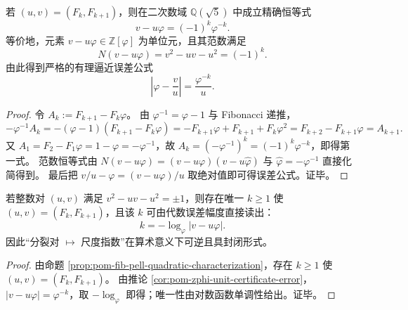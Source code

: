 \begin{corollary}\label{cor:pom-zphi-unit-certificate-error}
若 \((u,v)=(F_k,F_{k+1})\)，则在二次数域 \(\mathbb{Q}(\sqrt5)\) 中成立精确恒等式
\[
\boxed{\;v-u\varphi=(-1)^k\varphi^{-k}.\;}
\]
等价地，元素 \(v-u\varphi\in\mathbb{Z}[\varphi]\) 为单位元，且其范数满足
\[
\boxed{\;N(v-u\varphi)=v^2-uv-u^2=(-1)^k.\;}
\]
由此得到严格的有理逼近误差公式
\[
\boxed{\;\left|\varphi-\frac{v}{u}\right|=\frac{\varphi^{-k}}{u}.\;}
\]
\end{corollary}
\begin{proof}
令 \(A_k:=F_{k+1}-F_k\varphi\)。
由 \(\varphi^{-1}=\varphi-1\) 与 Fibonacci 递推，
\[
-\varphi^{-1}A_k=-(\varphi-1)(F_{k+1}-F_k\varphi)
=-F_{k+1}\varphi+F_{k+1}+F_k\varphi^2
=F_{k+2}-F_{k+1}\varphi
=A_{k+1}.
\]
又 \(A_1=F_2-F_1\varphi=1-\varphi=-\varphi^{-1}\)，故
\(
A_k=(-\varphi^{-1})^{k}=(-1)^k\varphi^{-k}
\)，即得第一式。
范数恒等式由 \(N(v-u\varphi)=(v-u\varphi)(v-u\widehat\varphi)\) 与 \(\widehat\varphi=-\varphi^{-1}\) 直接化简得到。
最后把 \(v/u-\varphi=(v-u\varphi)/u\) 取绝对值即可得误差公式。证毕。
\end{proof}

\begin{corollary}[由单个分裂对恢复尺度指数的可逆读出]\label{cor:pom-recover-k-from-unit-error}
若整数对 \((u,v)\) 满足 \(v^2-uv-u^2=\pm 1\)，则存在唯一 \(k\ge 1\) 使 \((u,v)=(F_k,F_{k+1})\)，且该 \(k\) 可由代数误差幅度直接读出：
\[
\boxed{\;k=-\log_\varphi|v-u\varphi|.\;}
\]
因此“分裂对 \(\mapsto\) 尺度指数”在算术意义下可逆且具封闭形式。
\end{corollary}
\begin{proof}
由命题 \ref{prop:pom-fib-pell-quadratic-characterization}，存在 \(k\ge 1\) 使 \((u,v)=(F_k,F_{k+1})\)。
由推论 \ref{cor:pom-zphi-unit-certificate-error}，
\(
|v-u\varphi|=\varphi^{-k}
\)，取 \(-\log_\varphi\) 即得；唯一性由对数函数单调性给出。证毕。
\end{proof}

